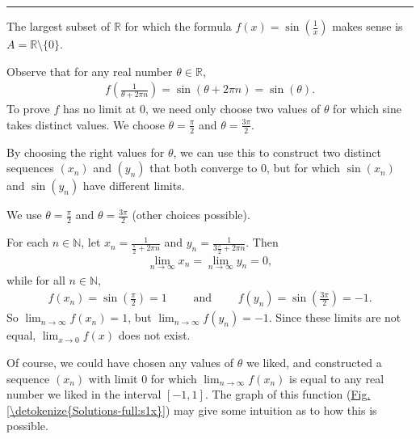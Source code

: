 \documentclass[letterpaper,10pt,english]{jupyterBook}
\begin{document}
\bigskip\hrule\bigskip


\sphinxAtStartPar
{\hyperref[\detokenize{Problems:id9}]{}}  The largest subset of \(\mathbb{R}\) for which the formula \(f(x)=\sin\left(\frac{1}{x}\right)\) makes sense is \(A = \mathbb{R} \setminus \{0\}\).

Observe that for any real number \(\theta\in\mathbb{R}\),
\begin{equation*}
\begin{split}
f\left(\frac{1}{\theta+2\pi n}\right) = \sin(\theta+2\pi n) = \sin(\theta).
\end{split}
\end{equation*}
\sphinxAtStartPar
To prove \(f\) has no limit at \(0\), we need only choose two values of \(\theta\) for which sine takes distinct values. We choose \(\theta=\frac{\pi}{2}\) and \(\theta=\frac{3\pi}{2}\).

By choosing the right values for \(\theta\), we can use this to construct two distinct sequences \((x_n)\) and \((y_n)\) that both converge to \(0\), but for which \(\sin(x_n)\) and \(\sin(y_n)\) have different limits.

We use \(\theta=\frac{\pi}{2}\) and \(\theta=\frac{3\pi}{2}\) (other choices possible).

For each \(n\in\mathbb{N}\), let \(x_n=\frac{1}{\frac{\pi}{2} + 2\pi n}\) and \(y_n=\frac{1}{3\frac{\pi}{2} + 2\pi n}\). Then
\begin{equation*}
\begin{split}
\lim_{n\rightarrow\infty} x_{n} =\lim_{n\rightarrow\infty} y_n= 0,
\end{split}
\end{equation*}
\sphinxAtStartPar
while for all \(n\in\mathbb{N}\),
\begin{equation*}
\begin{split}
f(x_n) = \sin\left(\frac{\pi}{2}\right) =1 \hspace{2em} \text{ and } \hspace{2em} f(y_n)=\sin\left(\frac{3\pi}{2}\right)=-1.
\end{split}
\end{equation*}
\sphinxAtStartPar
So \(\lim_{n\rightarrow\infty} f(x_{n}) = 1\), but \(\lim_{n\rightarrow\infty} f(y_n) = -1\). Since these limits are not equal, \(\lim_{x\to 0} f(x)\) does not exist.

Of course, we could have chosen any values of \(\theta\) we liked, and constructed a sequence \((x_n)\) with limit \(0\) for which \(\lim_{n\rightarrow\infty}f(x_n)\) is equal to any real number we liked in the interval \([-1,1]\). The graph of this function (\hyperref[\detokenize{Solutions-full:s1x}]{Fig.\@ \ref{\detokenize{Solutions-full:s1x}}}) may give some intuition as to how this is possible.
\end{document}
